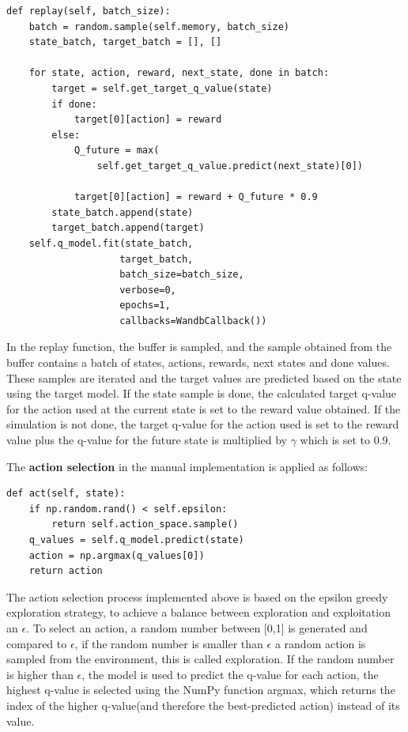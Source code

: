 \lstset{language=Python}
\lstset{frame=lines}
\lstset{basicstyle=\footnotesize}
\begin{lstlisting}
def replay(self, batch_size):
    batch = random.sample(self.memory, batch_size)
    state_batch, target_batch = [], []

    for state, action, reward, next_state, done in batch:
        target = self.get_target_q_value(state)
        if done:
            target[0][action] = reward
        else:
            Q_future = max(
                self.get_target_q_value.predict(next_state)[0])

            target[0][action] = reward + Q_future * 0.9
        state_batch.append(state)
        target_batch.append(target)
    self.q_model.fit(state_batch,
                    target_batch,
                    batch_size=batch_size,
                    verbose=0,
                    epochs=1,
                    callbacks=WandbCallback())
\end{lstlisting}

In the replay function, the buffer is sampled, and the sample obtained from the buffer contains a batch of states, actions, rewards, next states and done values.
These samples are iterated and the target values are predicted based on the state using the target model.
If the state sample is done, the calculated target q-value for the action used at the current state is set to the reward value obtained. If the simulation is not done, the target q-value for the action used is set to the reward value plus the q-value for the future state is multiplied by $\gamma$ which is set to 0.9.

The \textbf{action selection} in the manual implementation is applied as follows:

\lstset{language=Python}
\lstset{frame=lines}
\lstset{basicstyle=\footnotesize}
\begin{lstlisting}
def act(self, state):
    if np.random.rand() < self.epsilon:
        return self.action_space.sample()
    q_values = self.q_model.predict(state)
    action = np.argmax(q_values[0])
    return action
\end{lstlisting}

The action selection process implemented above is based on the epsilon greedy exploration strategy, to achieve a balance between exploration and exploitation an $\epsilon$. To select an action, a random number between [0,1] is generated and compared to $\epsilon$, if the random number is smaller than $\epsilon$ a random action is sampled from the environment, this is called exploration. If the random number is higher than $\epsilon$, the model is used to predict the q-value for each action, the highest q-value is selected using the NumPy function argmax, which returns the index of the higher q-value(and therefore the best-predicted action) instead of its value.


